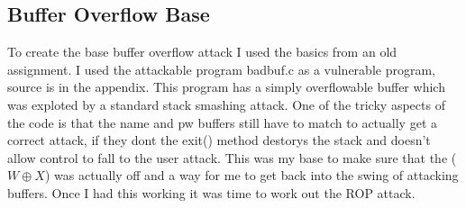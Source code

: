 \documentclass[11pt]{amsart}
\begin{document}
\subsection*{Buffer Overflow Base}
To create the base buffer overflow attack I used the basics from an old assignment.  I used the attackable program badbuf.c as a vulnerable program, source is in the appendix.  This program has a simply overflowable buffer which was exploted by a standard stack smashing attack. One of the tricky aspects of the code is that the name and pw buffers still have to match to actually get a correct attack, if they dont the exit() method destorys the stack and doesn't allow control to fall to the user attack. This was my base to make sure that the ($W \oplus X$) was actually off and a way for me to get back into the swing of attacking buffers.  Once I had this working it was time to work out the ROP attack.
\end{document}
